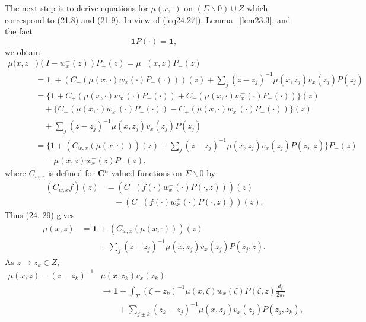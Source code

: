 \documentclass{surv-l}
\theoremstyle{plain}
\theoremstyle{definition}
\numberwithin{equation}{chapter}
\begin{document}
The next step is to derive equations for $\mu(x, \cdot)$ on $(\Sigma\backslash 0)\cup Z$ which correspond to (21.8) and (21.9). In view of (\ref{eq24.27}), Lemma ~\ref{lem23.3}, and the fact
\renewcommand{\theequation}{\thesection.\arabic{equation}}
\setcounter{section}{24}
\setcounter{equation}{27}
\begin{equation}\label{eq24.28}
\mathbf{1}P(\cdot)=\mathbf{1},
\end{equation}
we obtain
\begin{align}\label{eq24.29}
\mu(x, z & )(I-w_{x}^{-}(z))P_{-}(z)=\mu_{-}(x, z)P_{-}(z)\\\nonumber
& =\mathbf{1}\ +(C_{-}(\mu(x, \cdot)w_{x}(\cdot)P_{-}(\cdot)))(z)+\sum_{j}(z-z_{j})^{-1}\mu(x,z_{j})v_{x}(z_{j})P(z_{j})\\\nonumber
& =\{\mathbf{1}+C_{+}(\mu(x, \cdot)w_{x}^{-}(\cdot)P_{-}(\cdot))+C_{-}(\mu(x,\cdot)w_{x}^{+}(\cdot)P_{-}(\cdot))\}(z)\\\nonumber
&\quad +\{C_{-}(\mu(x, \cdot)w_{x}^{-}(\cdot)P_{-}(\cdot))-C_{+}(\mu(x, \cdot)w_{x}^{-}(\cdot)P_{-}(\cdot))\}(z)\\\nonumber
&\quad +\sum_{j}(z-z_{j})^{-1}\mu(x, z_{j})v_{x}(z_{j})P(z_{j})\\\nonumber
&=\{1+(C_{w,x}(\mu(x, \cdot)))(z)+\sum_{j}(z-z_{j})^{-1}\mu(x,z_{j})v_{x}(z_{j})P(z_{j}, z)\}P_{-}(z)\\\nonumber
&\quad -\mu(x, z)w_{x}^{-}(z)P_{-}(z),
\end{align}
where $C_{w, x}$ is defined for $\mathbf{C}^{n}$-valued functions on $\Sigma\backslash 0$ by
\begin{align}\label{eq24.30}
(C_{w,x}f)(z)& =(C_{+}(f(\cdot)w_{x}^{-}(\cdot)P(\cdot, z)))(z)\\
&\quad +(C_{-}(f(\cdot)w_{x}^{+}(\cdot)P(\cdot, z)))(z).\nonumber
\end{align}
Thus (24. 29) gives
\begin{align}\label{eq24.31}
\mu(x, z)& =\mathbf{1}\ +(C_{w,x}(\mu(x, \cdot)))(z)\\ \nonumber
&\qquad +\sum_{j}(z-z_{j})^{-1}\mu(x, z_{j})v_{x}(z_{j})P(z_{j},z).
\end{align}
As $z\rightarrow z_{k}\in Z$,
\begin{align*}
\mu(x, z)-(z-z_{k})^{-1}& \mu(x,z_{k})v_{x}(z_{k})\\
&\rightarrow \mathbf{1}+\int_{\Sigma}(\zeta-z_{k})^{-1}\mu(x,\zeta)w_{x}(\zeta)P(\zeta,z)\frac{d_{\zeta}}{2\pi i}\\
&\quad \quad +\sum_{j\pm k}(z_{k}-z_{j})^{-1}\mu(x,z_{j})v_{x}(z_{j})P(z_{j},z_{k}),
\end{align*}
\end{document}
